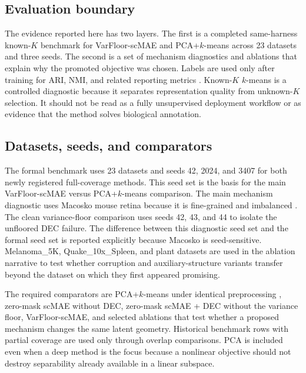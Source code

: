 \documentclass[11pt]{article}
\begin{document}
\subsection{Evaluation boundary}

The evidence reported here has two layers. The first is a completed same-harness known-$K$ benchmark for VarFloor-scMAE and PCA+$k$-means across 23 datasets and three seeds. The second is a set of mechanism diagnostics and ablations that explain why the promoted objective was chosen. Labels are used only after training for ARI, NMI, and related reporting metrics \citep{hubert1985comparing,vinh2010information}. Known-$K$ $k$-means is a controlled diagnostic because it separates representation quality from unknown-$K$ selection. It should not be read as a fully unsupervised deployment workflow or as evidence that the method solves biological annotation.

\subsection{Datasets, seeds, and comparators}

The formal benchmark uses 23 datasets and seeds 42, 2024, and 3407 for both newly registered full-coverage methods. This seed set is the basis for the main VarFloor-scMAE versus PCA+$k$-means comparison. The main mechanism diagnostic uses Macosko mouse retina because it is fine-grained and imbalanced \citep{macosko2015dropseq}. The clean variance-floor comparison uses seeds 42, 43, and 44 to isolate the unfloored DEC failure. The difference between this diagnostic seed set and the formal seed set is reported explicitly because Macosko is seed-sensitive. Melanoma\_5K, Quake\_10x\_Spleen, and plant datasets are used in the ablation narrative to test whether corruption and auxiliary-structure variants transfer beyond the dataset on which they first appeared promising.

The required comparators are PCA+$k$-means under identical preprocessing \citep{jolliffe2002pca,lloyd1982least,arthur2007kmeanspp}, zero-mask scMAE without DEC, zero-mask scMAE + DEC without the variance floor, VarFloor-scMAE, and selected ablations that test whether a proposed mechanism changes the same latent geometry. Historical benchmark rows with partial coverage are used only through overlap comparisons. PCA is included even when a deep method is the focus because a nonlinear objective should not destroy separability already available in a linear subspace.
\end{document}
